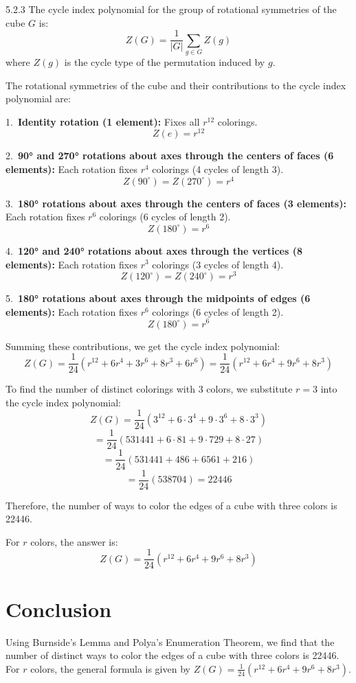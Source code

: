 \documentclass[12pt]{amsart}
\theoremstyle{definition}
\numberwithin{equation}{section}
\begin{document}
\begin{exercise}{5.2.3}
    The cycle index polynomial for the group of rotational symmetries of the cube \(G\) is:
    \[
    Z(G) = \frac{1}{|G|} \sum_{g \in G} Z(g)
    \]
    where \(Z(g)\) is the cycle type of the permutation induced by \(g\).

    The rotational symmetries of the cube and their contributions to the cycle index polynomial are:

    1.\ \textbf{Identity rotation (1 element):} Fixes all \(r^{12}\) colorings.
    \[
    Z(e) = r^{12}
    \]

    2.\ \textbf{90° and 270° rotations about axes through the centers of faces (6 elements):} Each rotation fixes \(r^4\) colorings (4 cycles of length 3).
    \[
    Z(90^\circ) = Z(270^\circ) = r^4
    \]

    3.\ \textbf{180° rotations about axes through the centers of faces (3 elements):} Each rotation fixes \(r^6\) colorings (6 cycles of length 2).
    \[
    Z(180^\circ) = r^6
    \]

    4.\ \textbf{120° and 240° rotations about axes through the vertices (8 elements):} Each rotation fixes \(r^3\) colorings (3 cycles of length 4).
    \[
    Z(120^\circ) = Z(240^\circ) = r^3
    \]

    5.\ \textbf{180° rotations about axes through the midpoints of edges (6 elements):} Each rotation fixes \(r^6\) colorings (6 cycles of length 2).
    \[
    Z(180^\circ) = r^6
    \]

    Summing these contributions, we get the cycle index polynomial:
    \[
    Z(G) = \frac{1}{24} \left( r^{12} + 6r^4 + 3r^6 + 8r^3 + 6r^6 \right) = \frac{1}{24} \left( r^{12} + 6r^4 + 9r^6 + 8r^3 \right)
    \]

    To find the number of distinct colorings with 3 colors, we substitute \(r = 3\) into the cycle index polynomial:
    \[
    Z(G) = \frac{1}{24} \left( 3^{12} + 6 \cdot 3^4 + 9 \cdot 3^6 + 8 \cdot 3^3 \right)
    \]
    \[
    = \frac{1}{24} \left( 531441 + 6 \cdot 81 + 9 \cdot 729 + 8 \cdot 27 \right)
    \]
    \[
    = \frac{1}{24} \left( 531441 + 486 + 6561 + 216 \right)
    \]
    \[
    = \frac{1}{24} \left( 538704 \right) = 22446
    \]

    Therefore, the number of ways to color the edges of a cube with three colors is 22446.

    For \(r\) colors, the answer is:
    \[
    Z(G) = \frac{1}{24} \left( r^{12} + 6r^4 + 9r^6 + 8r^3 \right)
    \]

    \section*{Conclusion}
    Using Burnside's Lemma and Polya's Enumeration Theorem, we find that the number of distinct ways to color the edges of a cube with three colors is 22446. For \(r\) colors, the general formula is given by \(Z(G) = \frac{1}{24} (r^{12} + 6r^4 + 9r^6 + 8r^3)\).

\end{exercise}
\newpage
\end{document}
